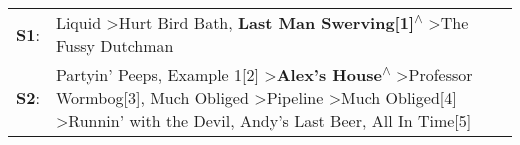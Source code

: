 \begin{supertabular}{p{0.03\textwidth}p{0.92\textwidth}}
 \textbf{S1}:  &                                                                                                                                                                                                                                                                                                           Liquid\textsuperscript{} \textgreater \enspace Hurt Bird Bath\textsuperscript{}, \enspace \textbf{Last Man Swerving[1]\textsuperscript{$\wedge$}} \textgreater \enspace The Fussy Dutchman\textsuperscript{}  \enspace  \\
 \textbf{S2}:  &  Partyin' Peeps\textsuperscript{}, \enspace Example 1[2]\textsuperscript{} \textgreater \enspace \textbf{Alex's House\textsuperscript{$\wedge$}} \textgreater \enspace Professor Wormbog[3]\textsuperscript{}, \enspace Much Obliged\textsuperscript{} \textgreater \enspace Pipeline\textsuperscript{} \textgreater \enspace Much Obliged[4]\textsuperscript{} \textgreater \enspace Runnin' with the Devil\textsuperscript{}, \enspace Andy's Last Beer\textsuperscript{}, \enspace All In Time[5]\textsuperscript{}  \enspace  \\
\end{supertabular}
